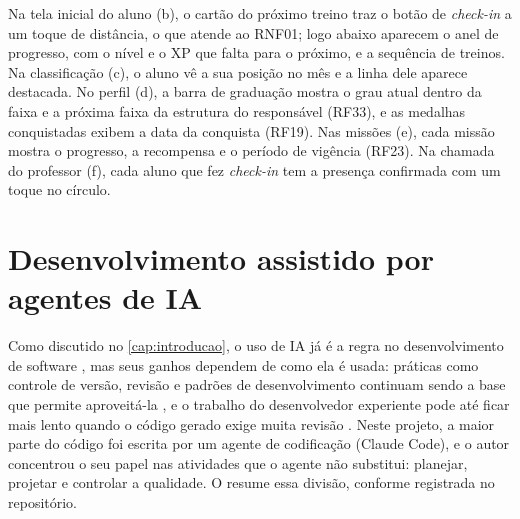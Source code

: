 Na tela inicial do aluno (b), o cartão do próximo treino traz o botão de
\textit{check-in} a um toque de distância, o que atende ao RNF01; logo
abaixo aparecem o anel de progresso, com o nível e o XP que falta para o
próximo, e a sequência de treinos. Na classificação (c), o aluno vê a sua
posição no mês e a linha dele aparece destacada. No perfil (d), a barra
de graduação mostra o grau atual dentro da faixa e a próxima faixa da
estrutura do responsável (RF33), e as medalhas conquistadas exibem a data
da conquista (RF19). Nas missões (e), cada missão mostra o progresso, a
recompensa e o período de vigência (RF23). Na chamada do professor (f),
cada aluno que fez \textit{check-in} tem a presença confirmada com um
toque no círculo.

\section{Desenvolvimento assistido por agentes de IA}
\label{sec:dev-ia}

Como discutido no \autoref{cap:introducao}, o uso de IA já é a regra no
desenvolvimento de software \cite{dora2025,stackoverflow2025}, mas seus
ganhos dependem de como ela é usada: práticas como controle de versão,
revisão e padrões de desenvolvimento continuam sendo a base que permite
aproveitá-la \cite{dora2025}, e o trabalho do desenvolvedor experiente
pode até ficar mais lento quando o código gerado exige muita revisão
\cite{becker2025}. Neste projeto, a maior parte do código foi escrita por
um agente de codificação (Claude Code), e o autor concentrou o seu papel
nas atividades que o agente não substitui: planejar, projetar e controlar
a qualidade. O  resume essa divisão, conforme
registrada no repositório.

